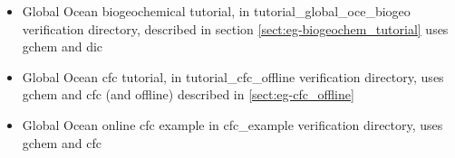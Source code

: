 \begin{itemize}
\item{Global Ocean biogeochemical tutorial, in tutorial\_global\_oce\_biogeo verification directory,   
described in section \ref{sect:eg-biogeochem_tutorial} uses gchem and dic }

\item{Global Ocean cfc tutorial, in tutorial\_cfc\_offline verification directory,   
uses gchem and cfc (and offline) described in \ref{sect:eg-cfc_offline} }

\item{Global Ocean online cfc example in cfc\_example verification directory,   
uses gchem and cfc}



\end{itemize}

